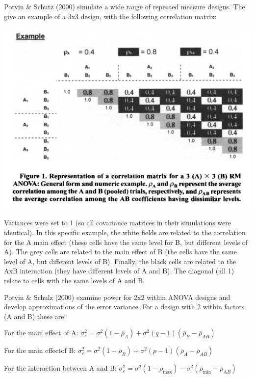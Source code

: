\documentclass[]{book}
\begin{document}
Potvin \& Schutz (2000) simulate a wide range of repeated measure designs. The give an example of a 3x3 design, with the following correlation matrix:

\includegraphics{screenshots/PS2000.png}

Variances were set to 1 (so all covariance matrices in their simulations were identical). In this specific example, the white fields are related to the correlation for the A main effect (these cells have the same level for B, but different levels of A). The grey cells are related to the main effect of B (the cells have the same level of A, but different levels of B). Finally, the black cells are related to the AxB interaction (they have different levels of A and B). The diagonal (all 1) relate to cells with the same levels of A and B.

Potvin \& Schulz (2000) examine power for 2x2 within ANOVA designs and develop approximations of the error variance. For a design with 2 within factors (A and B) these are:

For the main effect of A:
\(\sigma _ { e } ^ { 2 } = \sigma ^ { 2 } ( 1 - \overline { \rho } _ { A } ) + \sigma ^ { 2 } ( q - 1 ) ( \overline { \rho } _ { B } - \overline { \rho } _ { AB } )\)

For the main effectof B:
\(\sigma _ { e } ^ { 2 } = \sigma ^ { 2 } ( 1 - \overline { \rho } _ { B } ) + \sigma ^ { 2 } ( p - 1 ) ( \overline { \rho } _ { A } - \overline { \rho } _ { A B } )\)

For the interaction between A and B:
\(\sigma _ { e } ^ { 2 } = \sigma ^ { 2 } ( 1 - \rho _ { \max } ) - \sigma ^ { 2 } ( \overline { \rho } _ { \min } - \overline { \rho } _ { AB } )\)
\end{document}
